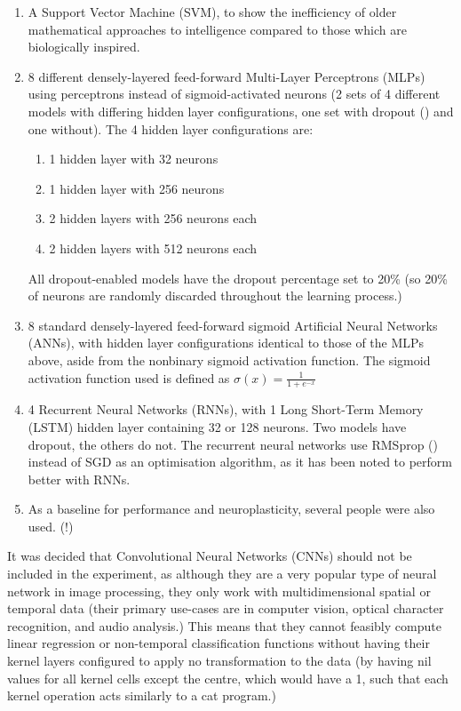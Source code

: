 \documentclass[]{report}
\begin{document}
\begin{enumerate}
	\item A Support Vector Machine (SVM), to show the inefficiency of older mathematical approaches to intelligence compared to those which are biologically inspired.
	\item 8 different densely-layered feed-forward Multi-Layer Perceptrons (MLPs) using perceptrons instead of sigmoid-activated neurons (2 sets of 4 different models with differing hidden layer configurations, one set with dropout (\cite{dropout14}) and one without).
	\newline
	The 4 hidden layer configurations are:
	\begin{enumerate}
		\item 1 hidden layer with 32 neurons
		\item 1 hidden layer with 256 neurons
		\item 2 hidden layers with 256 neurons each
		\item 2 hidden layers with 512 neurons each
	\end{enumerate}
	All dropout-enabled models have the dropout percentage set to 20\% (so 20\% of neurons are randomly discarded throughout the learning process.)
	\item 8 standard densely-layered feed-forward sigmoid Artificial Neural Networks (ANNs), with hidden layer configurations identical to those of the MLPs above, aside from the nonbinary sigmoid activation function.
	\newline
	The sigmoid activation function used is defined as \(\sigma(x) = \frac{1}{1+e^{-x}}\)
	\item 4 Recurrent Neural Networks (RNNs), with 1 Long Short-Term Memory (LSTM) hidden layer containing 32 or 128 neurons. Two models have dropout, the others do not.
	\newline
	The recurrent neural networks use RMSprop (\cite{hinton2012neural}) instead of SGD as an optimisation algorithm, as it has been noted to perform better with RNNs.
	\item As a baseline for performance and neuroplasticity, several people were also used. (!)
\end{enumerate}

It was decided that Convolutional Neural Networks (CNNs) should not be included in the experiment, as although they are a very popular type of neural network in image processing, they only work with multidimensional spatial or temporal data (their primary use-cases are in computer vision, optical character recognition, and audio analysis.) This means that they cannot feasibly compute linear regression or non-temporal classification functions without having their kernel layers configured to apply no transformation to the data (by having nil values for all kernel cells except the centre, which would have a 1, such that each kernel operation acts similarly to a cat program.)
\end{document}
